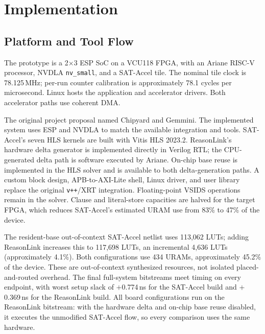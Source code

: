 \section{Implementation}
\label{sec:impl}
\subsection{Platform and Tool Flow}
The prototype is a 2$\times$3 ESP SoC on a VCU118 FPGA, with an Ariane RISC-V processor, NVDLA \texttt{nv\_small}, and a SAT-Accel tile. The nominal tile clock is 78.125\,MHz; per-run counter calibration is approximately 78.1 cycles per microsecond. Linux hosts the application and accelerator drivers. Both accelerator paths use coherent DMA.

The original project proposal named Chipyard and Gemmini. The implemented system uses ESP and NVDLA to match the available integration and tools. SAT-Accel's seven HLS kernels are built with Vitis HLS 2023.2. ReasonLink's hardware delta generator is implemented directly in Verilog RTL; the CPU-generated delta path is software executed by Ariane. On-chip base reuse is implemented in the HLS solver and is available to both delta-generation paths. A custom block design, APB-to-AXI-Lite shell, Linux driver, and user library replace the original \texttt{v++}/XRT integration. Floating-point VSIDS operations remain in the solver. Clause and literal-store capacities are halved for the target FPGA, which reduces SAT-Accel's estimated URAM use from 83\% to 47\% of the device.

The resident-base out-of-context SAT-Accel netlist uses 113,062 LUTs; adding ReasonLink increases this to 117,698 LUTs, an incremental 4,636 LUTs (approximately 4.1\%). Both configurations use 434 URAMs, approximately 45.2\% of the device. These are out-of-context synthesized resources, not isolated placed-and-routed overhead. The final full-system bitstreams meet timing on every endpoint, with worst setup slack of $+$0.774\,ns for the SAT-Accel build and $+$0.369\,ns for the ReasonLink build. All board configurations run on the ReasonLink bitstream: with the hardware delta and on-chip base reuse disabled, it executes the unmodified SAT-Accel flow, so every comparison uses the same hardware.


